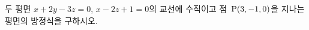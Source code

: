 두 평면 $x+2y-3z=0$, $x-2z+1=0$의 교선에 수직이고 점~$\mathrm{P}(3{,}\mkern3mu\mathopen{}-1{,}\mkern3mu\mathopen{}0)$을 지나는 평면의 방정식을 구하시오.
